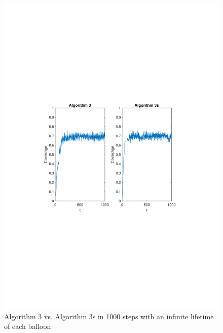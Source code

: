 \begin{figure}
\centering
\includegraphics[scale=0.7, trim={3cm 10cm 4cm 9cm},clip]{graphics/coverage_alg3_vs_alg3s_1000steps_LIFETIMELONG.pdf}
\caption{Algorithm 3 vs. Algorithm 3s in 1000 steps with an infinite lifetime of each balloon }
\label{fig:alg3vsalg3s_long}
\end{figure}

